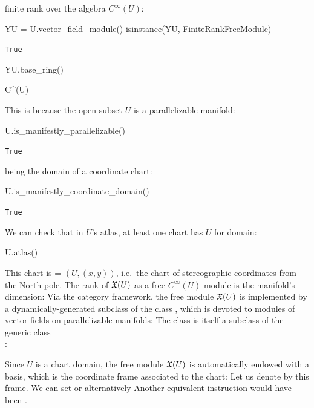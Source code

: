 finite rank over the algebra $C^\infty(U)$:
\begin{NBin}
YU = U.vector_field_module()
isinstance(YU, FiniteRankFreeModule)
\end{NBin}
\begin{NBout}
\texttt{True}
\end{NBout}
\begin{NBin}
YU.base_ring()
\end{NBin}
\begin{NBoutM}
C^{\infty}\left(U\right)
\end{NBoutM}
This is because the open subset $U$ is a parallelizable manifold:
\begin{NBin}
U.is_manifestly_parallelizable()
\end{NBin}
\begin{NBout}
\texttt{True}
\end{NBout}
being the domain of a coordinate chart:
\begin{NBin}
U.is_manifestly_coordinate_domain()
\end{NBin}
\begin{NBout}
\texttt{True}
\end{NBout}
We can check that in $U$'s atlas, at least one chart has $U$ for domain:
\begin{NBin}
U.atlas()
\end{NBin}
\begin{NBoutM}
\end{NBoutM}
This chart is  = $(U, (x,y))$, i.e.\ the chart of stereographic coordinates
from the North pole.
The rank of $\mathfrak{X}(U)$ as a free $C^\infty(U)$-module is the manifold's dimension:
Via the category framework,
the free module $\mathfrak{X}(U)$ is implemented by a dynamically-generated subclass
of the class , which is devoted to modules of vector fields
on parallelizable manifolds:
The class  is itself a subclass
of the generic class\\ :

Since $U$ is a chart domain, the free module $\mathfrak{X}(U)$ is automatically endowed with a basis,
which is the coordinate frame associated to the chart:
Let us denote by  this frame. We can set  or
alternatively
Another equivalent instruction would have been .

